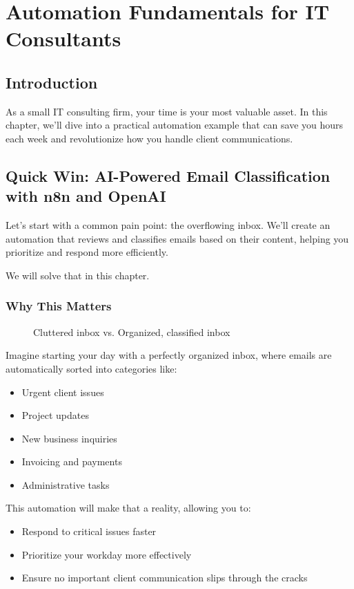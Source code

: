 \chapter{Automation Fundamentals for IT Consultants}



\section{Introduction}

As a small IT consulting firm, your time is your most valuable asset. In this chapter, we'll dive into a practical automation example that can save you hours each week and revolutionize how you handle client communications.


\section{Quick Win: AI-Powered Email Classification with n8n and OpenAI}

Let's start with a common pain point: the overflowing inbox. We'll create an automation that reviews and classifies emails based on their content, helping you prioritize and respond more efficiently.

We will solve that in this chapter.

\subsection{Why This Matters}

\begin{figure}[h]
    \centering
    \caption{Cluttered inbox vs. Organized, classified inbox}
\end{figure}

Imagine starting your day with a perfectly organized inbox, where emails are automatically sorted into categories like:

\begin{itemize}
    \item Urgent client issues
    \item Project updates
    \item New business inquiries
    \item Invoicing and payments
    \item Administrative tasks
\end{itemize}

This automation will make that a reality, allowing you to:
\begin{itemize}
    \item Respond to critical issues faster
    \item Prioritize your workday more effectively
    \item Ensure no important client communication slips through the cracks
\end{itemize}

